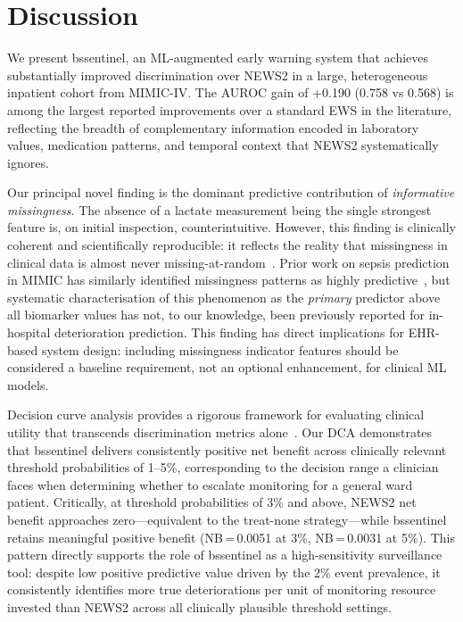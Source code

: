 \documentclass[12pt]{article}
\begin{document}
\section*{Discussion}

We present bssentinel, an ML-augmented early warning system that achieves
substantially improved discrimination over NEWS2 in a large, heterogeneous
inpatient cohort from MIMIC-IV. The AUROC gain of +0.190 (0.758 vs 0.568)
is among the largest reported improvements over a standard EWS in the
literature, reflecting the breadth of complementary information encoded in
laboratory values, medication patterns, and temporal context that NEWS2
systematically ignores.

Our principal novel finding is the dominant predictive contribution of
\emph{informative missingness}. The absence of a lactate measurement being the
single strongest feature is, on initial inspection, counterintuitive. However,
this finding is clinically coherent and scientifically reproducible: it
reflects the reality that missingness in clinical data is almost never
missing-at-random~\cite{sperrin2017, wells2013}. Prior work on sepsis
prediction in MIMIC has similarly identified missingness patterns as highly
predictive~\cite{rajkomar2018}, but systematic characterisation of this
phenomenon as the \emph{primary} predictor above all biomarker values has not,
to our knowledge, been previously reported for in-hospital deterioration
prediction. This finding has direct implications for EHR-based system design:
including missingness indicator features should be considered a baseline
requirement, not an optional enhancement, for clinical ML models.

Decision curve analysis provides a rigorous framework for evaluating clinical
utility that transcends discrimination metrics alone~\cite{vickers2006dca}.
Our DCA demonstrates that bssentinel delivers consistently positive net benefit
across clinically relevant threshold probabilities of 1--5\%, corresponding to
the decision range a clinician faces when determining whether to escalate
monitoring for a general ward patient. Critically, at threshold probabilities
of 3\% and above, NEWS2 net benefit approaches zero---equivalent to the
treat-none strategy---while bssentinel retains meaningful positive benefit
(NB\,=\,0.0051 at 3\%, NB\,=\,0.0031 at 5\%). This pattern directly supports
the role of bssentinel as a high-sensitivity surveillance tool: despite low
positive predictive value driven by the 2\% event prevalence, it consistently
identifies more true deteriorations per unit of monitoring resource invested
than NEWS2 across all clinically plausible threshold settings.
\end{document}
